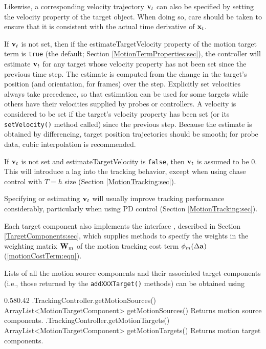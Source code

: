 Likewise, a corresponding velocity trajectory ${\bf v}_t$ can also be
specified by setting the {\sf velocity} property of the target
object. When doing so, care should be taken to ensure that it is
consistent with the actual time derivative of ${\bf x}_t$.

If ${\bf v}_t$ is not set, then if the {\sf estimateTargetVelocity}
property of the motion target term is {\tt true} (the default; Section
\ref{MotionTermProperties:sec}), the controller will estimate ${\bf v}_t$ for any
target whose {\sf velocity} property has not been set since the previous time
step. The estimate is computed from the change in the target's position (and
orientation, for frames) over the step. Explicitly set velocities always take
precedence, so that estimation can be used for some targets while others have
their velocities supplied by probes or controllers. A velocity is considered to
be set if the target's {\sf velocity} property has been set (or its {\tt
setVelocity()} method called) since the previous step. Because the estimate is
obtained by differencing, target position trajectories should be smooth; for
probe data, cubic interpolation is recommended.

If ${\bf v}_t$ is not set and {\sf estimateTargetVelocity} is {\tt false}, then
${\bf v}_t$ is assumed to be 0. This will introduce a lag into the tracking
behavior, except when using chase control with $T = h$ size
(Section \ref{MotionTracking:sec}).

\begin{sideblock}
Specifying or estimating ${\bf v}_t$ will usually improve tracking performance
considerably, particularly when using PD control
(Section \ref{MotionTracking:sec}).
\end{sideblock}

Each target component also implements the interface
, described in
Section \ref{TargetComponents:sec}, which supplies methods to specify the
weights in the weighting matrix ${\bf W}_m$ of the motion tracking cost term
$\phi_m(\Delta {\bf a})$ (\ref{motionCostTerm:eqn}).

Lists of all the motion source components and their associated target
components (i.e., those returned by the {\tt addXXXTarget()} methods) can be
obtained using
%
\begin{methodtable}{0.58}{0.42}
\midline
%
\methodentry
{\inverse.TrackingController.getMotionSources()}%
{ArrayList<MotionTargetComponent> getMotionSources()}%
{Returns motion source components.}%
%
\methodentry
{\inverse.TrackingController.getMotionTargets()}%
{ArrayList<MotionTargetComponent> getMotionTargets()}%
{Returns motion target components.}%
%
\midline
\end{methodtable}
%

